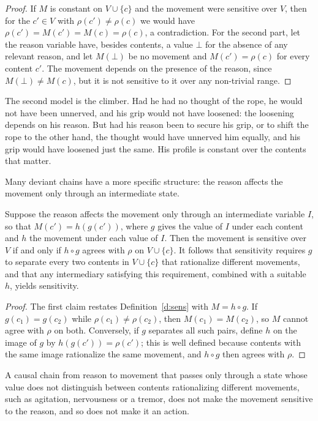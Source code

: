 \documentclass{situationist-preprint}
\begin{document}
\begin{proof}
If $M$ is constant on $V \cup \{c\}$ and the movement were sensitive over $V$, then for the $c' \in V$ with $\rho(c') \neq \rho(c)$ we would have $\rho(c') = M(c') = M(c) = \rho(c)$, a contradiction. For the second part, let the reason variable have, besides contents, a value $\bot$ for the absence of any relevant reason, and let $M(\bot)$ be no movement and $M(c') = \rho(c)$ for every content $c'$. The movement depends on the presence of the reason, since $M(\bot) \neq M(c)$, but it is not sensitive to it over any non-trivial range.
\end{proof}

The second model is the climber. Had he had no thought of the rope, he would not have been unnerved, and his grip would not have loosened: the loosening depends on his reason. But had his reason been to secure his grip, or to shift the rope to the other hand, the thought would have unnerved him equally, and his grip would have loosened just the same. His profile is constant over the contents that matter.

Many deviant chains have a more specific structure: the reason affects the movement only through an intermediate state.

\begin{proposition}\label{p:inter}
Suppose the reason affects the movement only through an intermediate variable $I$, so that $M(c') = h(g(c'))$, where $g$ gives the value of $I$ under each content and $h$ the movement under each value of $I$. Then the movement is sensitive over $V$ if and only if $h \circ g$ agrees with $\rho$ on $V \cup \{c\}$. It follows that sensitivity requires $g$ to separate every two contents in $V \cup \{c\}$ that rationalize different movements, and that any intermediary satisfying this requirement, combined with a suitable $h$, yields sensitivity.
\end{proposition}

\begin{proof}
The first claim restates Definition~\ref{d:sens} with $M = h \circ g$. If $g(c_1) = g(c_2)$ while $\rho(c_1) \neq \rho(c_2)$, then $M(c_1) = M(c_2)$, so $M$ cannot agree with $\rho$ on both. Conversely, if $g$ separates all such pairs, define $h$ on the image of $g$ by $h(g(c')) = \rho(c')$; this is well defined because contents with the same image rationalize the same movement, and $h \circ g$ then agrees with $\rho$.
\end{proof}

\begin{corollary}\label{c:agitation}
A causal chain from reason to movement that passes only through a state whose value does not distinguish between contents rationalizing different movements, such as agitation, nervousness or a tremor, does not make the movement sensitive to the reason, and so does not make it an action.
\end{corollary}
\end{document}
